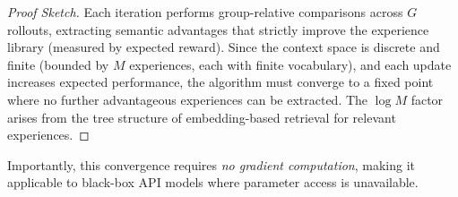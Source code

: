\begin{proof}[Proof Sketch]
Each iteration performs group-relative comparisons across $G$ rollouts, extracting semantic advantages that strictly improve the experience library (measured by expected reward). Since the context space is discrete and finite (bounded by $M$ experiences, each with finite vocabulary), and each update increases expected performance, the algorithm must converge to a fixed point where no further advantageous experiences can be extracted. The $\log M$ factor arises from the tree structure of embedding-based retrieval for relevant experiences.
\end{proof}

Importantly, this convergence requires \textit{no gradient computation}, making it applicable to black-box API models where parameter access is unavailable.

